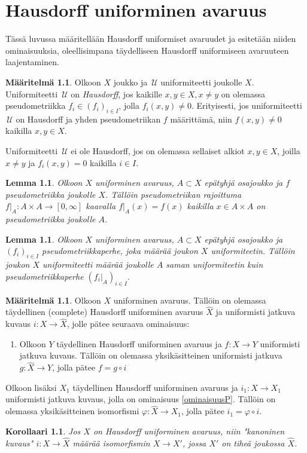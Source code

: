 \documentclass[12pt,a4paper,leqno]{report}
\newcommand{\U}{\,\mathcal{U}}
\theoremstyle{plain}
\newtheorem{lem}[equation]{Lemma}
\newtheorem{kor}[equation]{Korollaari}
\theoremstyle{definition}
\newtheorem{maar}[equation]{Määritelmä}
\theoremstyle{remark}
\begin{document}
\chapter{Hausdorff uniforminen avaruus}
Tässä luvussa määritellään Hausdorff uniformiset avaruudet ja 
esitetään niiden ominaisuuksia, 
oleellisimpana täydelliseen Hausdorff uniformiseen avaruuteen laajentaminen.
\begin{maar}
Olkoon $X$ joukko ja $\U$ uniformiteetti joukolle $X$. 
Uniformiteetti $\U$ on \emph{Hausdorff}, jos kaikille $x,y\in X,x\neq y$ on 
olemassa pseudometriikka $f_i\in(f_i)_{i\in I}$, jolla $f_i(x,y)\neq 0$. 
Erityisesti, jos uniformiteetti $\U$ on Hausdorff 
ja yhden pseudometriikan $f$ määrittämä, 
niin $f(x,y)\neq 0$ kaikilla $x,y\in X$.

Uniformiteetti $\U$ ei ole Hausdorff, jos on olemassa sellaiset alkiot $x,y\in X$, joilla $x\neq y$ ja $f_i(x,y)=0$ kaikilla $i\in I$.
\end{maar}
\begin{lem}
Olkoon $X$ uniforminen avaruus, $A\subset X$ epätyhjä osajoukko 
ja $f$ pseudometriikka joukolle $X$. 
Tällöin pseudometriikan rajoittuma 
$f|_A\colon A\times A\rightarrow [0,\infty]$ kaavalla $ f|_A(x)=f(x)$ 
kaikilla $x\in A\times A$ 
on pseudometriikka joukolle $A$. 
\end{lem}
\begin{lem}
Olkoon $X$ uniforminen avaruus, $A\subset X$ epätyhjä osajoukko 
ja $(f_i)_{i\in I}$ pseudometriikkaperhe, 
joka määrää joukon $X$ uniformiteetin. 
Tällöin joukon $X$ uniformiteetti määrää joukolle $A$ saman uniformiteetin 
kuin pseudometriikkaperhe $(f_i|_A)_{i\in I}$.
\end{lem}
\begin{maar}
Olkoon $X$ uniforminen avaruus. 
Tällöin on olemassa täydellinen (complete) Hausdorff 
uniforminen avaruus $\hat X$ ja uniformisti jatkuva 
kuvaus $i\colon X\rightarrow\hat X$, jolle pätee seuraava ominaisuus:
\begin{enumerate} [label=(P),ref=(P)]
\item %
\label{ominaisuusP}
Olkoon $Y$ täydellinen Hausdorff uniforminen avaruus 
ja $f\colon X\rightarrow Y$ uniformisti jatkuva kuvaus. 
Tällöin on olemassa yksikäsitteinen uniformisti 
jatkuva $g\colon \hat X\rightarrow Y$, 
jolla pätee $f=g\circ i$
\end{enumerate}
Olkoon lisäksi $X_1$ täydellinen Hausdorff 
uniforminen avaruus ja $i_1\colon X\rightarrow X_1$
uniformisti jatkuva kuvaus, jolla on ominaisuus \ref{ominaisuusP}. 
Tällöin on olemassa yksikäsitteinen isomorfismi $\varphi\colon\hat X\rightarrow X_1$, jolla pätee $i_1=\varphi\circ i$.
\end{maar}
\begin{kor}
Jos $X$ on Hausdorff uniforminen avaruus, niin 
"kanoninen kuvaus" $i\colon X\rightarrow\hat X$ määrää 
isomorfismin $X\rightarrow X'$, jossa $X'$ on tiheä joukossa $\hat X$.
\end{kor}
\end{document}
